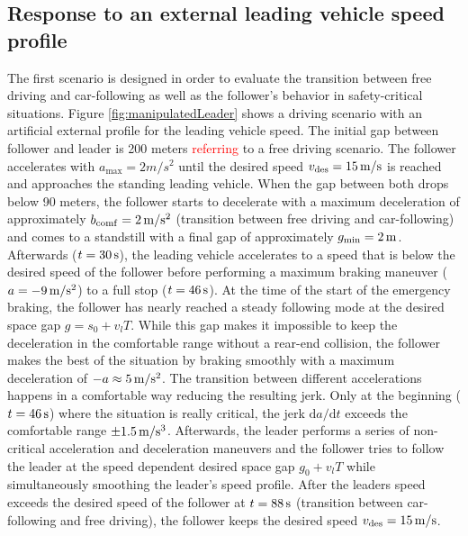 \documentclass[review]{elsarticle}
\providecommand{\red}[1]{\textcolor{red}{#1}}
\providecommand{\martin}[1]{\red{#1}} %
\providecommand{\sub}[1]{_{\mathrm{#1}}}  %
\providecommand{\3}{{\ss}}
\begin{document}
\subsection{Response to an external leading vehicle speed profile}
The first scenario is designed in order to evaluate the transition between free driving and car-following as well as the follower's behavior in safety-critical situations. 
Figure \ref{fig:manipulatedLeader} shows a driving scenario with an
artificial external profile for the leading vehicle speed. The initial
gap between 
follower and leader is 200 meters \martin{referring} to a free driving
scenario. The follower accelerates with $a\sub{max} = 2m/s^2$ until
the desired speed $v\sub{des} = \unit[15]{m/s} $ is reached and approaches
the standing leading vehicle. When the gap between both drops below 90
meters, the follower starts to decelerate with a maximum
  deceleration of approximately $b_{\rm
  comf} = \unit[2]{m/s^2}$ (transition between free driving and car-following)
and comes to a standstill with a final gap of approximately 
$g\sub{min} = \unit[2]{m}$. Afterwards ($t=\unit[30]{s}$),  the leading vehicle accelerates to a speed
that is below the desired speed of the follower before performing a
maximum braking maneuver ($a=\unit[-9]{m/s^2}$) to a full stop ($t=\unit[46]{s}$). At the time of the start of the
  emergency braking, the follower has nearly reached a steady
  following mode at the desired space gap $g=s_0+v_l T$. While this
  gap makes it impossible to keep the deceleration in the comfortable
  range without a rear-end collision, the follower makes the best of
  the situation by braking smoothly with a maximum deceleration of $-a
  \approx \unit[5]{m/s^2}$.  The transition between different
accelerations happens in a comfortable way reducing the resulting
jerk. Only at the beginning ($t=\unit[46]{s}$) where the situation is
really critical, the jerk $\text{d}a/\text{d}t$ exceeds the comfortable range 
$\pm \unit[1.5]{m/s^3}$. Afterwards, the leader performs a series of
non-critical acceleration and deceleration maneuvers and the follower
tries to follow the leader at the speed dependent desired space gap
$g_0+v_lT$ while simultaneously smoothing the leader's speed profile. After the leaders speed exceeds the desired speed of the follower at $t=\unit[88]{s}$ (transition between car-following and free driving), the follower keeps the desired speed $v\sub{des} = \unit[15]{m/s} $.
\end{document}
